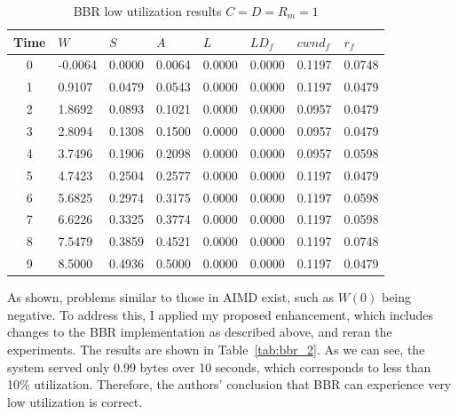 \documentclass[12pt]{l4dc2023}
\begin{document}
\begin{table}[htbp]
\centering
\begin{tabular}{|c|l|l|l|l|l|l|l|}
\hline
\textbf{Time} & \textbf{$W$} & \textbf{$S$} & \textbf{$A$} & \textbf{$L$} & \textbf{$LD_f$} & \textbf{$cwnd_f$} & \textbf{$r_f$} \\
\hline
0 & -0.0064 & 0.0000 & 0.0064 & 0.0000 & 0.0000 & 0.1197 & 0.0748 \\
1 & 0.9107  & 0.0479 & 0.0543 & 0.0000 & 0.0000 & 0.1197 & 0.0479 \\
2 & 1.8692  & 0.0893 & 0.1021 & 0.0000 & 0.0000 & 0.0957 & 0.0479 \\
3 & 2.8094  & 0.1308 & 0.1500 & 0.0000 & 0.0000 & 0.0957 & 0.0479 \\
4 & 3.7496  & 0.1906 & 0.2098 & 0.0000 & 0.0000 & 0.0957 & 0.0598 \\
5 & 4.7423  & 0.2504 & 0.2577 & 0.0000 & 0.0000 & 0.1197 & 0.0479 \\
6 & 5.6825  & 0.2974 & 0.3175 & 0.0000 & 0.0000 & 0.1197 & 0.0598 \\
7 & 6.6226  & 0.3325 & 0.3774 & 0.0000 & 0.0000 & 0.1197 & 0.0598 \\
8 & 7.5479  & 0.3859 & 0.4521 & 0.0000 & 0.0000 & 0.1197 & 0.0748 \\
9 & 8.5000  & 0.4936 & 0.5000 & 0.0000 & 0.0000 & 0.1197 & 0.0479 \\
\hline
\end{tabular}
\caption{BBR low utilization results $C=D=R_m=1$}
\label{tab:bbr_1}
\end{table}

As shown, problems similar to those in AIMD exist, such as $W(0)$ being negative. To address this, I applied my proposed enhancement, which includes changes to the BBR implementation as described above, and reran the experiments. The results are shown in Table~\ref{tab:bbr_2}. As we can see, the system served only 0.99 bytes over 10 seconds, which corresponds to less than 10\% utilization. Therefore, the authors' conclusion that BBR can experience very low utilization is correct.
\end{document}

